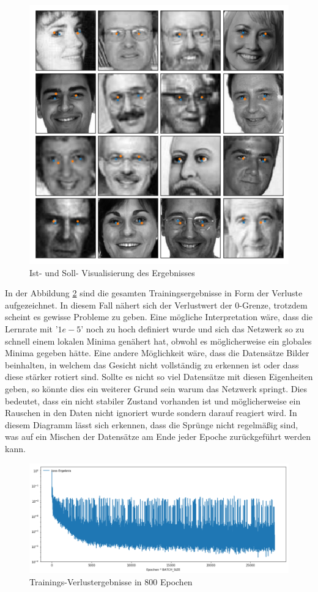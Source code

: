 \begin{figure}
	\centering
	\includegraphics[scale=0.5]{images/epoch-800-full.png}
	\caption{Ist- und Soll- Visualisierung des Ergebnisses}
	\label{fig:resultPic}
\end{figure}
In der Abbildung \ref{fig:lossDiag} sind die gesamten Trainingsergebnisse in Form der Verluste aufgezeichnet. 
In diesem Fall nähert sich der Verlustwert der $0$-Grenze, trotzdem scheint es gewisse Probleme zu geben. 
Eine mögliche Interpretation wäre, dass die Lernrate mit '$1e-5$' noch zu hoch definiert wurde und sich das Netzwerk so zu schnell einem lokalen Minima genähert hat, obwohl es möglicherweise ein globales Minima gegeben hätte. 
Eine andere Möglichkeit wäre, dass die Datensätze Bilder beinhalten, in welchem das Gesicht nicht vollständig zu erkennen ist oder dass diese stärker rotiert sind. 
Sollte es nicht so viel Datensätze mit diesen Eigenheiten geben, so könnte dies ein weiterer Grund sein warum das Netzwerk springt. 
Dies bedeutet, dass ein nicht stabiler Zustand vorhanden ist und möglicherweise ein Rauschen in den Daten nicht ignoriert wurde sondern darauf reagiert wird.
In diesem Diagramm lässt sich erkennen, dass die Sprünge nicht regelmäßig sind, was auf ein Mischen der Datensätze am Ende jeder Epoche zurückgeführt werden kann. 
\begin{figure}
	\centering
	\includegraphics[scale=0.4]{images/loss-diagram-all.png}
	\caption{Trainings-Verlustergebnisse in 800 Epochen}
	\label{fig:lossDiag}
\end{figure}


